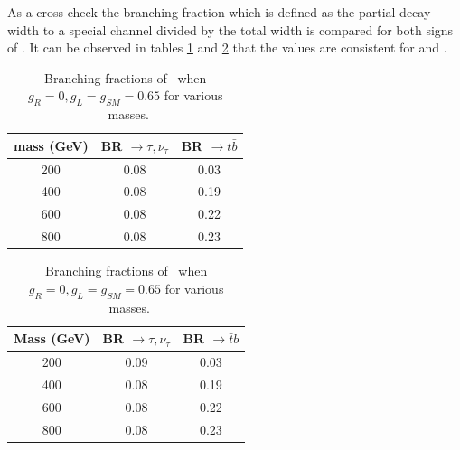 As a cross check the branching fraction which is defined as the partial decay width to a special channel divided by the total width is compared for both signs of \wprime. 
It can be observed in tables \ref{tab:W'Plus} and \ref{tab:W'Minus} that the values are consistent for \wprimep and \wprimem. 
\begin{table}[htb]
	\centering
	\begin{tabular}{|c|c|c|}
		\hline 
		\wprime mass (GeV)  &  BR \wprimep $\rightarrow \tau,\nu_\tau $& BR  \wprimep$\rightarrow  t \bar{b}$ \\
		\hline 
		200 & 0.08 & 0.03\\
		400 &0.08& 0.19\\
		600 &0.08&0.22\\
		800&0.08 &0.23\\
		\hline
	\end{tabular}
	\caption{Branching fractions of \wprimep ~when $ g_R=0 , g_L= g_{SM} = 0.65 $ for various \wprimep ~masses. \label{tab:W'Plus} }
\end{table}
\begin{table}[htb]
	\centering
	\begin{tabular}{|c|c|c|}
		\hline 
		\wprime Mass (GeV)  &  BR  \wprimem$\rightarrow \tau,\nu_\tau $ & BR  \wprimem$\rightarrow  \bar{t}b $ \\
		\hline 
		200 &  0.09 &0.03 \\
		400  &0.08 &0.19 \\
		600  &0.08&0.22\\
		800  &0.08 &0.23 \\
		\hline
	\end{tabular}
		\caption{Branching fractions of \wprimem  ~when $g_R=0 , g_L= g_{SM} = 0.65 $ for various \wprimem ~masses. \label{tab:W'Minus} }
\end{table}

